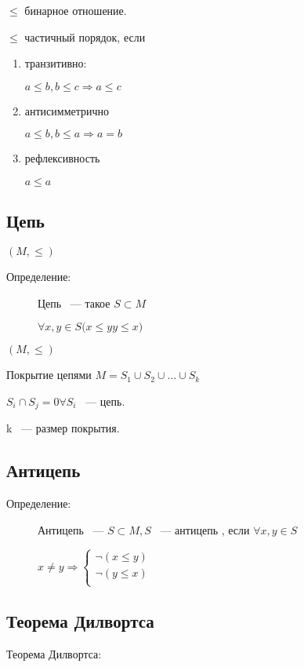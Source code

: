 \documentclass[12pt]{article}
\begin{document}
\begin{description}
\begin{description}
$\le$ бинарное отношение.

$\le$ частичный порядок, если

\begin{enumerate}
\item транзитивно:

$a \le b, b \le c \Rightarrow a \le c$

\item антисимметрично

$a \le b, b \le a \Rightarrow a = b$

\item рефлексивность

$a \le a$
\end{enumerate}
\end{description}

\subsection{Цепь}

$(M, \le)$

\begin{description}
\item[Определение:] Цепь ~--- такое $S \subset M$

$\forall x, y \in S (x \le y $$ y \le x)$
\end{description}

$(M, \le)$

Покрытие цепями $M = S_1 \cup S_2 \cup \ldots \cup  S_k$

$S_i \cap S_j = 0 \forall S_i$ ~--- цепь.

k ~--- размер покрытия.

\subsection{Антицепь} 

\begin{description}
\item[Определение:] Антицепь ~---  $S \subset M, S$ ~--- антицепь , если $\forall x, y \in S$

$x \ne y \Rightarrow \begin{cases} \neg (x \le y)\\ \neg (y \le x)\\ \end{cases}$

\end{description}

\subsection{Теорема Дилвортса}
\begin{description}
\item [Теорема Дилвортса:] 


\end{description}
\end{description}
\end{document}
